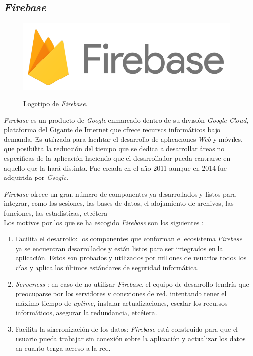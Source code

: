 \documentclass[twoside]{report}
\begin{document}
\subsection{\textit{Firebase}}
\label{firebase}

\begin{figure}[H]
\centering
\includegraphics[scale=0.3]{images/firebase}\\
\caption{Logotipo de \textit{Firebase}.} \cite{firebase}
\end{figure}


\textit{Firebase} es un producto de \textit{Google} enmarcado dentro de su división \textit{Google Cloud}, plataforma del Gigante de Internet que ofrece recursos informáticos bajo demanda. Es utilizada para facilitar el desarrollo de aplicaciones \textit{Web} y móviles, que posibilita la reducción del tiempo que se dedica a desarrollar áreas no específicas de la aplicación haciendo que el desarrollador pueda centrarse en aquello que la hará distinta. Fue creada en el año 2011 aunque en 2014 fue adquirida por \textit{Google}.

\textit{Firebase} ofrece un gran número de componentes ya desarrollados y listos para integrar, como las sesiones, las bases de datos, el alojamiento de archivos, las funciones, las estadísticas, etcétera.\\

Los motivos por los que se ha escogido \textit{Firebase} son los siguientes \cite{firebaseadvdis}:

\begin{enumerate}

\item Facilita el desarrollo: los componentes que conforman el ecosistema \textit{Firebase} ya se encuentran desarrollados y están listos para ser integrados en la aplicación. Estos son probados y utilizados por millones de usuarios todos los días y aplica los últimos estándares de seguridad informática.

\item \textit{Serverless} : en caso de no utilizar \textit{Firebase}, el equipo de desarrollo tendría que preocuparse por los servidores y conexiones de red, intentando tener el máximo tiempo de \textit{uptime}, instalar actualizaciones, escalar los recursos informáticos, asegurar la redundancia, etcétera.

\item Facilita la sincronización de los datos: \textit{Firebase} está construido para que el usuario pueda trabajar sin conexión sobre la aplicación y actualizar los datos en cuanto tenga acceso a la red.
\end{enumerate}
\end{document}
